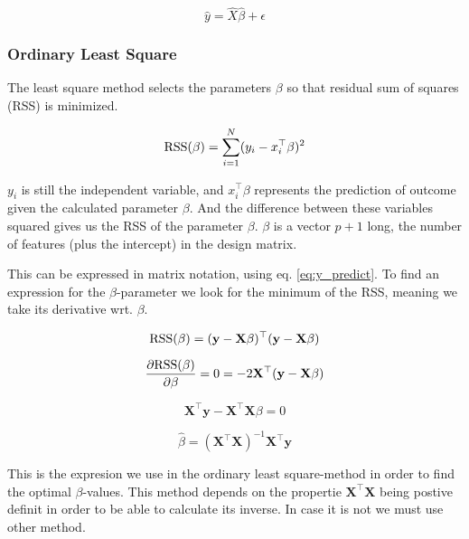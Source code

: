\documentclass[a4paper,12pt, english]{article}
\begin{document}
\begin{equation} \label{eq:y_predict}
\hat{y} = \hat{X} \hat{\beta} + \epsilon
\end{equation}


\subsubsection{Ordinary Least Square} \label{sec:OLS}

The least square method selects the parameters $\beta$ so that residual sum of squares (RSS) is minimized.

\begin{equation}
\textnormal{RSS}(\beta) = \sum_{i=1}^{N} (y_i - x_i^{\top}\beta)^2
\end{equation}

$y_i$ is still the independent variable, and $x_i^{\top}\beta$ represents the prediction of outcome given the calculated parameter $\beta$. And the difference between these variables squared gives us the RSS of the parameter $\beta$. $\beta$ is a vector $p + 1$ long, the number of features (plus the intercept) in the design matrix. 

This can be expressed in matrix notation, using eq. \ref{eq:y_predict}. To find an expression for the $\beta$-parameter we look for the minimum of the RSS, meaning we take its derivative wrt. $\beta$.

\begin{equation}
\textnormal{RSS}(\beta) = (\mathbf{y} - \mathbf{X}\beta)^{\top}(\mathbf{y} - \mathbf{X}\beta)
\end{equation}

\begin{equation}
\frac{\partial \textnormal{RSS}(\beta)}{\partial \beta} = 0 = -2 \mathbf{X}^{\top}(\mathbf{y} - \mathbf{X}\beta)
\end{equation}

\begin{equation}
\mathbf{X}^{\top}\mathbf{y} - \mathbf{X}^{\top}\mathbf{X} \beta = 0
\end{equation}

\begin{equation} \label{eq:beta}
\hat{\beta} = (\mathbf{X}^{\top}\mathbf{X})^{-1}\mathbf{X}^{\top}\mathbf{y}
\end{equation}

This is the expresion we use in the ordinary least square-method in order to find the optimal $\beta$-values. This method depends on the propertie $\mathbf{X^{\top}}\mathbf{X}$ being postive definit in order to be able to calculate its inverse. In case it is not we must use other method.
\end{document}
